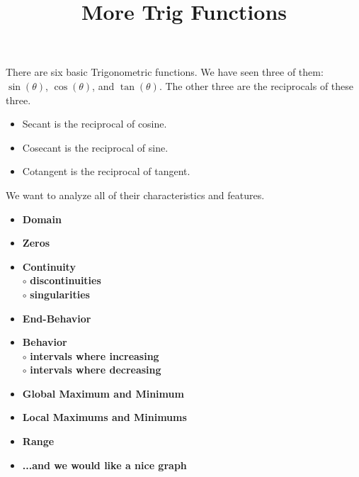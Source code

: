 \documentclass{ximera}
\title{More Trig Functions}
\begin{document}
\begin{abstract}
%
\end{abstract}
\maketitle



There are six basic Trigonometric functions.  We have seen three of them: $\sin(\theta)$, $\cos(\theta)$, and $\tan(\theta)$. The other three are the reciprocals of these three.


\begin{itemize}
\item Secant is the reciprocal of cosine.
\item Cosecant is the reciprocal of sine.
\item Cotangent is the reciprocal of tangent.
\end{itemize}


We want to analyze all of their characteristics and features. 




\begin{itemize}
     \item \textbf{\textcolor{red!70!black}{Domain}} 
     \item \textbf{\textcolor{red!70!black}{Zeros}} 
     \item \textbf{\textcolor{red!70!black}{Continuity}} \\
     \text{    }$\circ$ \textbf{\textcolor{purple!85!blue}{discontinuities}}\\
     \text{    }$\circ$ \textbf{\textcolor{purple!85!blue}{singularities}}\\
     \item \textbf{\textcolor{red!70!black}{End-Behavior}} 
     \item \textbf{\textcolor{red!70!black}{Behavior}} \\
     \text{    }$\circ$ \textbf{\textcolor{purple!85!blue}{intervals where increasing}}\\
     \text{    }$\circ$ \textbf{\textcolor{purple!85!blue}{intervals where decreasing}}\\
     \item \textbf{\textcolor{red!70!black}{Global Maximum and Minimum}} 
     \item \textbf{\textcolor{red!70!black}{Local Maximums and Minimums}} 
     \item \textbf{\textcolor{red!70!black}{Range}} 
     \item \textbf{\textcolor{blue!55!black}{...and we would like a nice graph}} 
\end{itemize}
\end{document}
